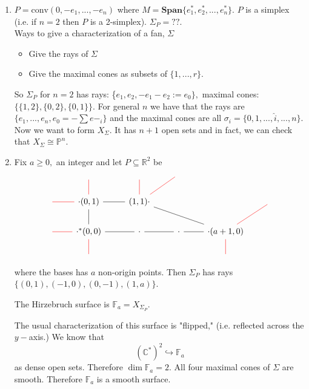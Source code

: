 \documentclass[a4paper,12pt]{amsart}
\newcommand{\C}{\ensuremath{\mathbb{C}}}
\newcommand{\R}{\ensuremath{\mathbb{R}}}
\begin{document}
\begin{enumerate}

	\item $P=\text{conv}(0,-e_1,...,-e_n)$ where $M=\textbf{Span}\{e_1^*,e_2^*,...,e_n^*\}$. $P$ is a simplex (i.e. if $n=2$ then $P$ is a 2-simplex). $\Sigma_P=??.$ \\
	
	Ways to give a characterization of a fan, $\Sigma$
	\begin{itemize}
		\item Give the rays of $\Sigma$ 
		\item Give the maximal cones as subsets of $\{1,...,r\}.$  
	\end{itemize}
	So $\Sigma_P$ for  $n=2$ has rays: \{$e_1,e_2,-e_1-e_2:=e_0\},$ maximal cones: $\{ \{1,2\} , \{0,2\}, \{ 0,1\}\}.$ For general $n$ we have that the rays are $\{e_1,...,e_n, e_0=-\sum e-_i\}$ and the maximal cones are all $\sigma_i=\{ 0,1,...,\hat{i},...,n\}.$ \\
Now we want to form $X_\Sigma.$ It has $n+1$ open sets and in fact, we can check that $X_\Sigma\cong \mathbb{P}^n.$ 



\item Fix $a\geq 0,$ an integer and let $P\subseteq \R^2$ be  \[ \begin{tikzcd}
	\text{}& \text{} \arrow[d,red,dash]&\text{} & \text{} &      \\
	\arrow[r,red,dash] &\cdot(0,1) \arrow[r,dash] \arrow[d,dash] &(1,1) \cdot \arrow[rrd, dash] \arrow[ur,red,dash]  \arrow[u,red,dash] & & &\text{}   \\
	\arrow[r,red,dash]&\cdot^*(0,0) \arrow[r,dash] \arrow[d,red,dash] &	\cdot &\cdot \arrow[l,dash]   &\cdot (a+1,0) \arrow[l,dash] \arrow[d,red,dash]\arrow[ru,red,dash] &   \\
&\text{} & & &	\text{}
	\end{tikzcd}\]
	where the bases has $a$ non-origin points. 
	Then $\Sigma_P$ has rays $\{ (0,1), (-1,0), (0,-1), (1,a)\}.$ 
\begin{definition}
	The Hirzebruch surface is $\mathbb{F}_a=X_{\Sigma_P}.$
\end{definition}   
The usual characterization of this surface is "flipped," (i.e. reflected across the $y-$axis.)
We know that \[(\C^*)^2\hookrightarrow \mathbb{F}_a\] as dense open sets. Therefore $\dim \mathbb{F}_a=2.$ All four maximal cones of $\Sigma$ are smooth. Therefore $\mathbb{F}_a$ is a smooth surface. 



\end{enumerate}
\end{document}
